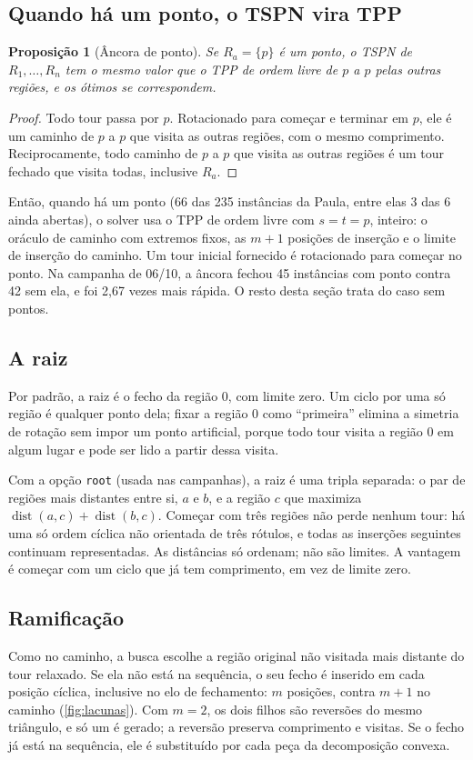 \documentclass[11pt,a4paper]{article}
\theoremstyle{plain}\newtheorem{proposicao}{Proposição}
\theoremstyle{definition}\newtheorem{definicao}{Definição}
\theoremstyle{plain}\newtheorem{teorema}{Teorema}
\theoremstyle{plain}\newtheorem{lema}{Lema}
\newcommand{\code}[1]{\texttt{\small #1}}
\DeclareMathOperator{\dist}{dist}
\begin{document}
\subsection{Quando há um ponto, o TSPN vira TPP}\label{sec:ancora}
\begin{proposicao}[Âncora de ponto]\label{prop:ancoraponto}
Se \(R_a=\{p\}\) é um ponto, o TSPN de \(R_1,\dots,R_n\) tem o mesmo valor que o TPP de ordem livre de \(p\) a \(p\) pelas outras regiões, e os ótimos se correspondem.
\end{proposicao}
\begin{proof}
Todo tour passa por \(p\). Rotacionado para começar e terminar em \(p\), ele é um caminho de \(p\) a \(p\) que visita as outras regiões, com o mesmo comprimento. Reciprocamente, todo caminho de \(p\) a \(p\) que visita as outras regiões é um tour fechado que visita todas, inclusive \(R_a\).
\end{proof}
Então, quando há um ponto (66 das 235 instâncias da Paula, entre elas 3 das 6 ainda abertas), o solver usa o TPP de ordem livre com \(s=t=p\), inteiro: o oráculo de caminho com extremos fixos, as \(m+1\) posições de inserção e o limite de inserção do caminho. Um tour inicial fornecido é rotacionado para começar no ponto. Na campanha de 06/10, a âncora fechou 45 instâncias com ponto contra 42 sem ela, e foi 2,67 vezes mais rápida. O resto desta seção trata do caso sem pontos.

\subsection{A raiz}\label{sec:raiz}
Por padrão, a raiz é o fecho da região 0, com limite zero. Um ciclo por uma só região é qualquer ponto dela; fixar a região 0 como ``primeira'' elimina a simetria de rotação sem impor um ponto artificial, porque todo tour visita a região 0 em algum lugar e pode ser lido a partir dessa visita.

Com a opção \code{root} (usada nas campanhas), a raiz é uma tripla separada: o par de regiões mais distantes entre si, \(a\) e \(b\), e a região \(c\) que maximiza \(\dist(a,c)+\dist(b,c)\). Começar com três regiões não perde nenhum tour: há uma só ordem cíclica não orientada de três rótulos, e todas as inserções seguintes continuam representadas. As distâncias só ordenam; não são limites. A vantagem é começar com um ciclo que já tem comprimento, em vez de limite zero.

\subsection{Ramificação}\label{sec:ramificacao}
Como no caminho, a busca escolhe a região original não visitada mais distante do tour relaxado. Se ela não está na sequência, o seu fecho é inserido em cada posição cíclica, inclusive no elo de fechamento: \(m\) posições, contra \(m+1\) no caminho (\cref{fig:lacunas}). Com \(m=2\), os dois filhos são reversões do mesmo triângulo, e só um é gerado; a reversão preserva comprimento e visitas. Se o fecho já está na sequência, ele é substituído por cada peça da decomposição convexa.
\end{document}
